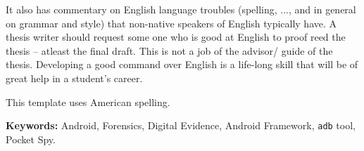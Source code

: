It also has commentary on English language troubles (spelling, ...,
and in general on grammar and style) that non-native speakers of
English typically have.  A thesis writer should request some one who
is good at English to proof reed the thesis -- atleast the final
draft.  This is not a job of the advisor/ guide of the thesis.
Developing a good command over English is a life-long skill that will
be of great help in a student's career.

This template uses American spelling.

\vfill

\noindent
{\bf Keywords:} Android, Forensics, Digital Evidence, Android
Framework, {\tt adb} tool, Pocket Spy.

\newpage




